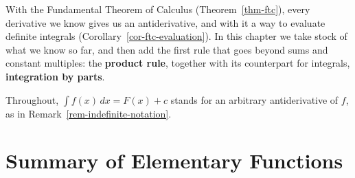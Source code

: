 \documentclass[
  letterpaper,
  DIV=11,
  numbers=noendperiod]{scrreprt}
\theoremstyle{plain}
\theoremstyle{plain}
\theoremstyle{definition}
\theoremstyle{definition}
\theoremstyle{definition}
\theoremstyle{plain}
\theoremstyle{plain}
\theoremstyle{remark}
\begin{document}
With the Fundamental Theorem of Calculus (Theorem~\ref{thm-ftc}), every
derivative we know gives us an antiderivative, and with it a way to
evaluate definite integrals (Corollary~\ref{cor-ftc-evaluation}). In
this chapter we take stock of what we know so far, and then add the
first rule that goes beyond sums and constant multiples: the
\textbf{product rule}, together with its counterpart for integrals,
\textbf{integration by parts}.

Throughout, \(\int f(x)\,dx = F(x)+c\) stands for an arbitrary
antiderivative of \(f\), as in Remark~\ref{rem-indefinite-notation}.

\section{Summary of Elementary
Functions}\label{summary-of-elementary-functions}
\end{document}
